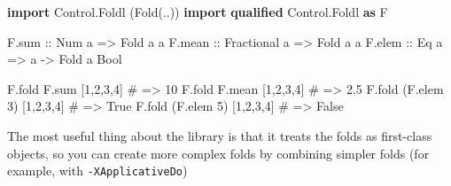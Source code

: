 \documentclass[]{article}
\newenvironment{Shaded}{}{}
\newcommand{\CommentTok}[1]{\textcolor[rgb]{0.38,0.63,0.69}{\textit{#1}}}
\newcommand{\DataTypeTok}[1]{\textcolor[rgb]{0.56,0.13,0.00}{#1}}
\newcommand{\DecValTok}[1]{\textcolor[rgb]{0.25,0.63,0.44}{#1}}
\newcommand{\FunctionTok}[1]{\textcolor[rgb]{0.02,0.16,0.49}{#1}}
\newcommand{\KeywordTok}[1]{\textcolor[rgb]{0.00,0.44,0.13}{\textbf{#1}}}
\newcommand{\NormalTok}[1]{#1}
\newcommand{\OperatorTok}[1]{\textcolor[rgb]{0.40,0.40,0.40}{#1}}
\newcommand{\OtherTok}[1]{\textcolor[rgb]{0.00,0.44,0.13}{#1}}
\newcommand{\PreprocessorTok}[1]{\textcolor[rgb]{0.74,0.48,0.00}{#1}}
\begin{document}
\begin{Shaded}
\begin{Highlighting}[]
\KeywordTok{import}           \DataTypeTok{Control.Foldl}\NormalTok{   (}\DataTypeTok{Fold}\NormalTok{(..))}
\KeywordTok{import} \KeywordTok{qualified} \DataTypeTok{Control.Foldl}   \KeywordTok{as} \DataTypeTok{F}

\NormalTok{F.sum}\OtherTok{  ::} \DataTypeTok{Num}\NormalTok{ a        }\OtherTok{=\textgreater{}} \DataTypeTok{Fold}\NormalTok{ a a}
\NormalTok{F.mean}\OtherTok{ ::} \DataTypeTok{Fractional}\NormalTok{ a }\OtherTok{=\textgreater{}} \DataTypeTok{Fold}\NormalTok{ a a}
\NormalTok{F.elem}\OtherTok{ ::} \DataTypeTok{Eq}\NormalTok{ a         }\OtherTok{=\textgreater{}}\NormalTok{ a }\OtherTok{{-}\textgreater{}} \DataTypeTok{Fold}\NormalTok{ a }\DataTypeTok{Bool}

\NormalTok{F.fold F.sum  [}\DecValTok{1}\NormalTok{,}\DecValTok{2}\NormalTok{,}\DecValTok{3}\NormalTok{,}\DecValTok{4}\NormalTok{]}
\PreprocessorTok{\#   =\textgreater{} 10}
\NormalTok{F.fold F.mean [}\DecValTok{1}\NormalTok{,}\DecValTok{2}\NormalTok{,}\DecValTok{3}\NormalTok{,}\DecValTok{4}\NormalTok{]}
\PreprocessorTok{\#   =\textgreater{} 2.5}
\NormalTok{F.fold (F.elem }\DecValTok{3}\NormalTok{) [}\DecValTok{1}\NormalTok{,}\DecValTok{2}\NormalTok{,}\DecValTok{3}\NormalTok{,}\DecValTok{4}\NormalTok{]}
\PreprocessorTok{\#   =\textgreater{} True}
\NormalTok{F.fold (F.elem }\DecValTok{5}\NormalTok{) [}\DecValTok{1}\NormalTok{,}\DecValTok{2}\NormalTok{,}\DecValTok{3}\NormalTok{,}\DecValTok{4}\NormalTok{]}
\PreprocessorTok{\#   =\textgreater{} False}
\end{Highlighting}
\end{Shaded}

The most useful thing about the library is that it treats the folds as
first-class objects, so you can create more complex folds by combining simpler
folds (for example, with \texttt{-XApplicativeDo})

\begin{Shaded}
\end{Shaded}
\end{document}
